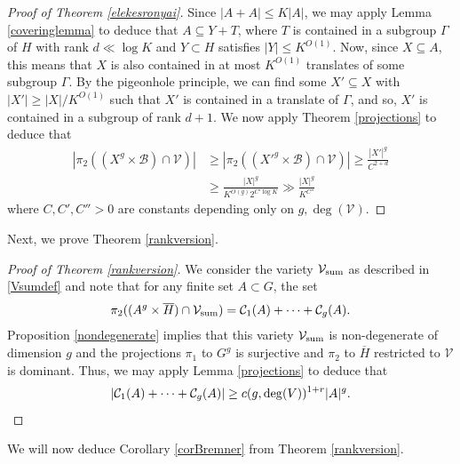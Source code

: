 \documentclass[12pt, reqno]{amsart}
\theoremstyle{remark}
\theoremstyle{definition}
\numberwithin{equation}{section}
\begin{document}
\begin{proof}[Proof of Theorem \ref{elekesronyai}]
Since $|A+A| \leq K|A|$, we may apply Lemma \ref{coveringlemma} to deduce that $A \subseteq Y +T$, where $T$ is contained in a subgroup $\Gamma$ of $H$ with rank $d \ll \log K$ and $Y \subset H$ satisfies $|Y| \leq K^{O(1)}$. Now, since $X \subseteq A$, this means that $X$ is also contained in at most $K^{O(1)}$ translates of some subgroup $\Gamma$. By the pigeonhole principle, we can find some $X'\subseteq X$ with $|X'| \geq |X|/K^{O(1)}$ such that $X'$ is contained in a translate of $\Gamma$, and so, $X'$ is contained in a subgroup of rank $d+1$. We now apply Theorem \ref{projections} to deduce that
\begin{align*}
    |\pi_2( (X^g \times \mathcal{B}) \cap \mathcal{V})| & \geq |\pi_2( (X'^g \times \mathcal{B}) \cap \mathcal{V})| \geq \frac{|X'|^g}{C^{2 + d}} \\
    & \geq \frac{|X|^g}{K^{O(g)} 2^{C' \log K}} \gg \frac{|X|^g}{K^{C''}}
\end{align*}
where $C,C', C''>0$ are constants depending only on $g, \deg(\mathcal{V})$.
\end{proof}

Next, we prove Theorem \ref{rankversion}.

\begin{proof}[Proof of Theorem \ref{rankversion}]
We consider the variety $\mathcal{V}_{\rm sum}$ as described in \eqref{Vsumdef} and note that for any finite set $A \subset G$, the set 
\[ \pi_2( (A^g \times \overline{H} ) \cap \mathcal{V}_{\rm sum}) = \mathcal{C}_1(A) + \dots + \mathcal{C}_g(A). \]
Proposition \ref{nondegenerate} implies that this variety $\mathcal{V}_{\rm sum}$ is non-degenerate of dimension $g$ and the projections $\pi_1$ to $G^g$ is surjective and $\pi_2$ to $\overline{H}$ restricted to $\mathcal{V}$ is dominant. Thus, we may apply Lemma \ref{projections} to deduce that 
\[ |\mathcal{C}_1(A) + \dots + \mathcal{C}_g(A)| \geq c(g, \deg(V))^{1+r}|A|^g. \qedhere \]
\end{proof}


We will now deduce Corollary \ref{corBremner} from Theorem \ref{rankversion}.
\end{document}
